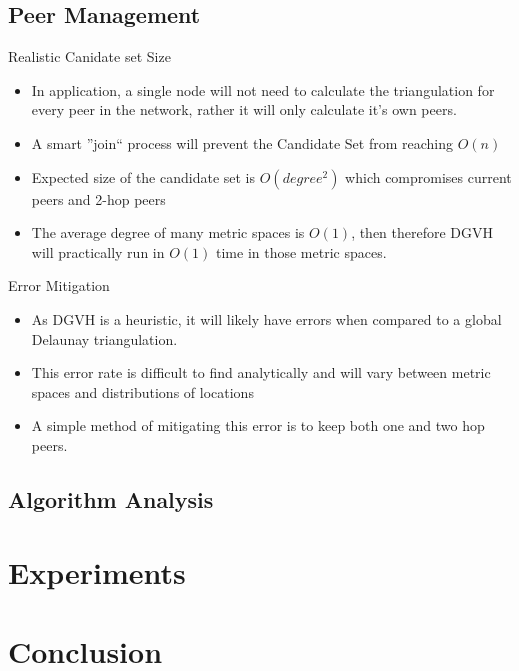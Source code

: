 \documentclass[8pt]{beamer}
\begin{document}
	\subsection{Peer Management}
	\begin{frame}{Realistic Canidate set Size}
		\begin{itemize}
			\item In application, a single node will not need to calculate the triangulation for every peer in the network, rather it will only calculate it's own peers.
			\item A smart ''join`` process will prevent the Candidate Set from reaching $O(n)$
			\item Expected size of the candidate set is $O(degree^2)$ which compromises current peers and 2-hop peers
			\item The average degree of many metric spaces is $O(1)$, then therefore DGVH will practically run in $O(1)$ time in those metric spaces.
		\end{itemize}
	\end{frame}
	\begin{frame}{Error Mitigation}
		\begin{itemize}
			\item As DGVH is a heuristic, it will likely have errors when compared to a global Delaunay triangulation.
			\item This error rate is difficult to find analytically and will vary between metric spaces and distributions of locations
			\item A simple method of mitigating this error is to keep both one and two hop peers.
		\end{itemize}
	\end{frame}
	
	\subsection{Algorithm Analysis}
	
	
	\section{Experiments}
	
	
	
	\section{Conclusion}
	
	
	
	\begin{frame}
		\frametitle{}
	\end{frame}
	
\end{document}
